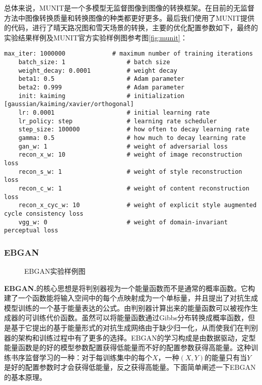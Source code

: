 总体来说，MUNIT是一个多模型无监督图像到图像的转换框架。在目前的无监督方法中图像转换质量和转换图像的种类都更好更多。最后我们使用了MUNIT提供的代码，进行了晴天路况图和雪天场景的转换，主要的优化配置参数如下，最终的实验结果样例及MUNIT官方实验样例图参考图\ref{fig:munit}：

\begin{lstlisting}[basicstyle=\small, caption={MUNIT主要优化参数配置}, captionpos=b]
    max_iter: 1000000             # maximum number of training iterations
    batch_size: 1                 # batch size
    weight_decay: 0.0001          # weight decay
    beta1: 0.5                    # Adam parameter
    beta2: 0.999                  # Adam parameter
    init: kaiming                 # initialization [gaussian/kaiming/xavier/orthogonal]
    lr: 0.0001                    # initial learning rate
    lr_policy: step               # learning rate scheduler
    step_size: 100000             # how often to decay learning rate
    gamma: 0.5                    # how much to decay learning rate
    gan_w: 1                      # weight of adversarial loss
    recon_x_w: 10                 # weight of image reconstruction loss
    recon_s_w: 1                  # weight of style reconstruction loss
    recon_c_w: 1                  # weight of content reconstruction loss
    recon_x_cyc_w: 10             # weight of explicit style augmented cycle consistency loss
    vgg_w: 0                      # weight of domain-invariant perceptual loss
\end{lstlisting}

\subsubsection[EBGAN]{EBGAN}

\begin{figure}[b]
    \centering
    \caption{EBGAN实验样例图}
    \label{fig:ebgan}
\end{figure}

\textbf{EBGAN.}\cite{ebgan}\quad 的核心思想是将判别器视为一个能量函数而不是通常的概率函数。它构建了一个函数能将输入空间中的每个点映射成为一个单标量，并且提出了对抗生成模型训练的一个基于能量表达的公式。由判别器计算出来的能量函数可以被视作生成器的可训练代价函数。虽然可以将能量函数通过Gibbs分布转换成概率函数，但是基于它提出的基于能量形式的对抗生成网络由于缺少归一化，从而使我们在判别器的架构和训练过程中有了更多的选择。EBGAN的学习构成是由数据驱动，定型能量函数是的好的模型参数配置获得低能量而不好的配置参数获得高能量。这种训练书序监督学习的一种：对于每训练集中的每个$X$，一种$(X,Y)$的能量只有当$Y$是好的配置参数时才会获得低能量，反之获得高能量。下面简单阐述一下EBGAN的基本原理。

